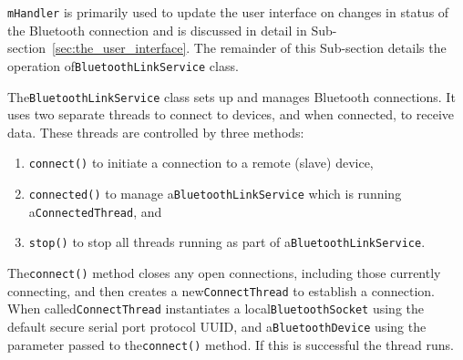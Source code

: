 \documentclass[11pt, a4paper, oneside, english]{scrbook}
\begin{document}
\texttt{mHandler} is primarily used to update the user interface on changes in status of the Bluetooth connection and is discussed in detail in Sub-section~\ref{sec:the_user_interface}. The remainder of this Sub-section details the operation of\lstinline{BluetoothLinkService} class.

The\lstinline{BluetoothLinkService} class sets up and manages Bluetooth connections. It uses two separate threads to connect to devices, and when connected, to receive data. These threads are controlled by three methods:
\begin{enumerate}
\item\lstinline{connect()} to initiate a connection to a remote (slave) device,
\item\lstinline{connected()} to manage a\lstinline{BluetoothLinkService} which is running a\lstinline{ConnectedThread}, and
\item\lstinline{stop()} to stop all threads running as part of a\lstinline{BluetoothLinkService}.
\end{enumerate}
The\lstinline{connect()} method closes any open connections, including those currently connecting, and then creates a new\lstinline{ConnectThread} to establish a connection. When called\lstinline{ConnectThread} instantiates a local\lstinline{BluetoothSocket} using the default secure serial port protocol UUID, and a\lstinline{BluetoothDevice} using the parameter passed to the\lstinline{connect()} method. If this is successful the thread runs.
\end{document}
